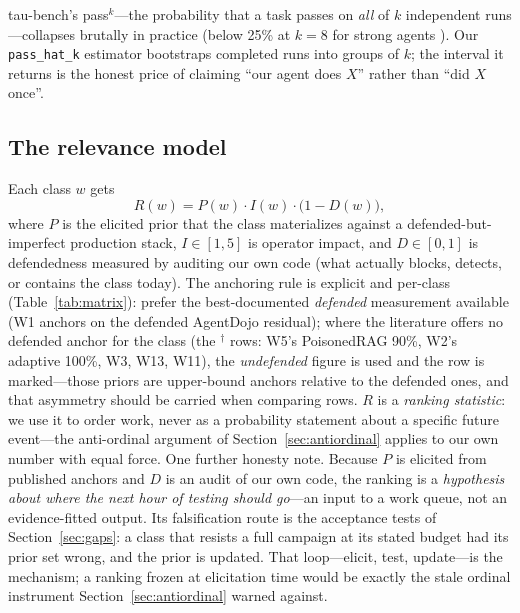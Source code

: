 tau-bench's pass$^k$---the probability that a task passes on \emph{all} of $k$
independent runs---collapses brutally in practice (below 25\% at $k=8$ for
strong agents \cite{taubench}). Our \texttt{pass\_hat\_k} estimator bootstraps
completed runs into groups of $k$; the interval it returns is the honest price
of claiming ``our agent does $X$'' rather than ``did $X$ once''.

\subsection{The relevance model}\label{sec:model}

Each class $w$ gets
\begin{equation}
R(w) = P(w)\cdot I(w)\cdot \bigl(1-D(w)\bigr),
\label{eq:model}
\end{equation}
where $P$ is the elicited prior that the class materializes against a
defended-but-imperfect production stack, $I\in[1,5]$ is operator impact, and
$D\in[0,1]$ is defendedness measured by auditing our own code (what actually
blocks, detects, or contains the class today). The anchoring rule is explicit
and per-class (Table~\ref{tab:matrix}): prefer the best-documented
\emph{defended} measurement available (W1 anchors on the defended AgentDojo
residual); where the literature offers no defended anchor for the class (the
$^{\dagger}$ rows: W5's PoisonedRAG 90\%, W2's adaptive 100\%, W3, W13, W11),
the \emph{undefended} figure is used and the row is marked---those priors are
upper-bound anchors relative to the defended ones, and that asymmetry should be
carried when comparing rows. $R$ is a \emph{ranking
statistic}: we use it to order work, never as a probability statement about a
specific future event---the anti-ordinal argument of Section~\ref{sec:antiordinal}
applies to our own number with equal force. One further honesty note. Because
$P$ is elicited from published anchors and $D$ is an audit of our own code, the
ranking is a \emph{hypothesis about where the next hour of testing should
go}---an input to a work queue, not an evidence-fitted output. Its
falsification route is the acceptance tests of Section~\ref{sec:gaps}: a class
that resists a full campaign at its stated budget had its prior set wrong, and
the prior is updated. That loop---elicit, test, update---is the mechanism; a
ranking frozen at elicitation time would be exactly the stale ordinal
instrument Section~\ref{sec:antiordinal} warned against.

